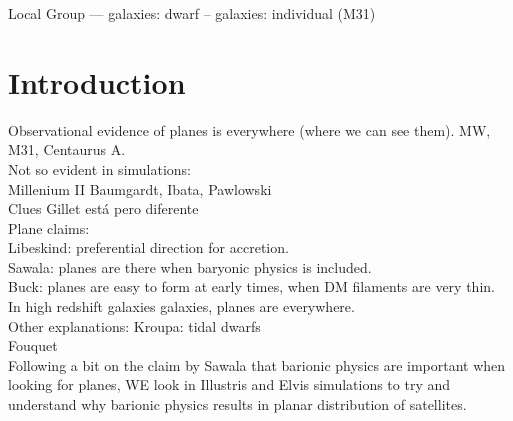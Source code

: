 \documentclass[useAMS,usenatbib]{mn2e}
\begin{document}
\date{Accepted xxx. Received xxxx; in original form xxxx}

\pagerange{\pageref{firstpage}--\pageref{lastpage}} 

\maketitle

\label{firstpage}

\begin{abstract}

\end{abstract}

\begin{keywords}
Local Group --- galaxies: dwarf -- galaxies: individual (M31)  
\end{keywords}

\section{Introduction}

Observational evidence of planes is everywhere (where we can see them). MW, M31, Centaurus A.\\

Not so evident in simulations:\\

Millenium II Baumgardt, Ibata, Pawlowski\\

Clues Gillet está pero diferente\\

Plane claims:\\
Libeskind: preferential direction for accretion.\\
Sawala: planes are there when baryonic physics is included.\\
Buck: planes are easy to form at early times, when DM filaments are very thin. In high redshift galaxies galaxies, planes are everywhere.\\

Other explanations: Kroupa: tidal dwarfs\\
Fouquet\\



 
Following a bit on the claim by Sawala that barionic physics are important when looking for planes, WE look in Illustris and Elvis simulations to try and understand why barionic physics results in planar distribution of satellites.
\end{document}
